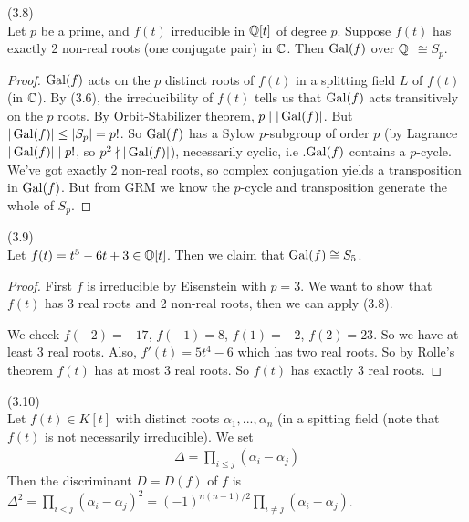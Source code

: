 \documentclass[a4paper]{article}
\begin{document}
\begin{lemma} (3.8)\\
Let $p$ be a prime, and $f(t)$ irreducible in $\mathbb{Q}[t]$ of degree $p$. Suppose $f(t)$ has exactly 2 non-real roots (one conjugate pair) in $\mathbb{C}$. Then $\operatorname{Gal}(f)$ over $\mathbb{Q}$ $\cong S_p$.
\begin{proof}
$\operatorname{Gal}(f)$ acts on the $p$ distinct roots of $f(t)$ in a splitting field $L$ of $f(t)$ (in $\mathbb{C}$). By (3.6), the irreducibility of $f(t)$ tells us that $\operatorname{Gal}(f)$ acts transitively on the $p$ roots. By Orbit-Stabilizer theorem, $p\mid |\operatorname{Gal}(f)|$. But $|\operatorname{Gal}(f)| \leq |S_p| = p!$. So $\operatorname{Gal}(f)$ has a Sylow $p$-subgroup of order $p$ (by Lagrance $|\operatorname{Gal}(f)| \mid p!$, so $p^2 \nmid |\operatorname{Gal}(f)|$), necessarily cyclic, i.e .$\operatorname{Gal}(f)$ contains a $p$-cycle. We've got exactly 2 non-real roots, so complex conjugation yields a transposition in $\operatorname{Gal}(f)$. But from GRM we know the $p$-cycle and transposition generate the whole of $S_p$.
\end{proof}
\end{lemma}

\begin{eg} (3.9)\\
Let $f(t) = t^5 - 6t+3 \in \mathbb{Q}[t]$. Then we claim that $\operatorname{Gal}(f) \cong S_5$.
\begin{proof}
First $f$ is irreducible by Eisenstein with $p=3$. We want to show that $f(t)$ has 3 real roots and 2 non-real roots, then we can apply (3.8).

We check $f(-2) = -17$, $f(-1) = 8$, $f(1) = -2$, $f(2) = 23$. So we have at least 3 real roots. Also, $f'(t) = 5t^4-6$ which has two real roots. So by Rolle's theorem $f(t)$ has at most 3 real roots. So $f(t)$ has exactly 3 real roots.
\end{proof}
\end{eg}

\begin{defi} (3.10)\\
Let $f(t) \in K[t]$ with distinct roots $\alpha_1,...,\alpha_n$ (in a spitting field (note that $f(t)$ is not necessarily irreducible). We set
\begin{equation*}
\begin{aligned}
\Delta = \prod_{i \leq j} (\alpha_i - \alpha_j)
\end{aligned}
\end{equation*}
Then the discriminant $D =D(f)$ of $f$ is $\Delta^2 = \prod_{i<j} (\alpha_i-\alpha_j)^2 = (-1)^{n(n-1)/2} \prod_{i \neq j} (\alpha_i - \alpha_j)$.
\end{defi}
\end{document}

